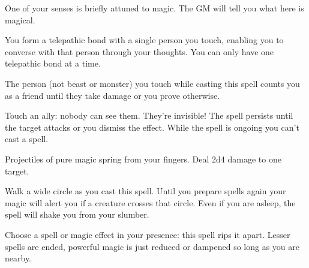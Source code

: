 

One of your senses is briefly attuned to magic. The GM will tell you what here is magical.

\newpage
{}


You form a telepathic bond with a single person you touch, enabling you to converse with that person through your thoughts. You can only have one telepathic bond at a time.



The person (not beast or monster) you touch while casting this spell counts you as a friend until they take damage or you prove otherwise.



Touch an ally: nobody can see them. They're invisible! The spell persists until the target attacks or you dismiss the effect. While the spell is ongoing you can't cast a spell.



Projectiles of pure magic spring from your fingers. Deal 2d4 damage to one target.



Walk a wide circle as you cast this spell. Until you prepare spells again your magic will alert you if a creature crosses that circle. Even if you are asleep, the spell will shake you from your slumber.



Choose a spell or magic effect in your presence: this spell rips it apart. Lesser spells are ended, powerful magic is just reduced or dampened so long as you are nearby.


